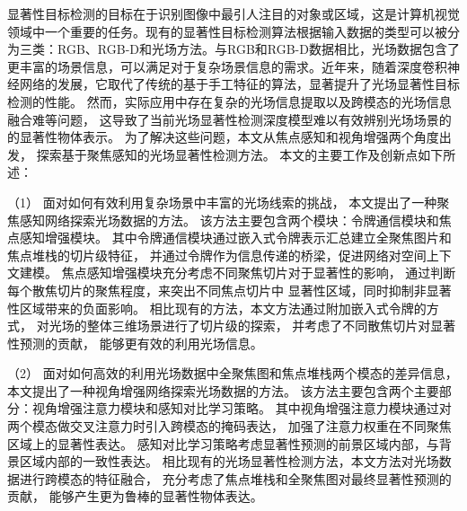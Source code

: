 显著性目标检测的目标在于识别图像中最引人注目的对象或区域，这是计算机视觉领域中一个重要的任务。现有的显著性目标检测算法根据输入数据的类型可以被分为三类：RGB、RGB-D和光场方法。与RGB和RGB-D数据相比，光场数据包含了更丰富的场景信息，可以满足对于复杂场景信息的需求。近年来，随着深度卷积神经网络的发展，它取代了传统的基于手工特征的算法，显著提升了光场显著性目标检测的性能。
%
%
%
%
然而，实际应用中存在复杂的光场信息提取以及跨模态的光场信息融合难等问题，
这导致了当前光场显著性检测深度模型难以有效辨别光场场景的的显著性物体表示。
%
%
为了解决这些问题，本文从焦点感知和视角增强两个角度出发，
探索基于聚焦感知的光场显著性检测方法。
本文的主要工作及创新点如下所述：









%
%
（1）
%
%
面对如何有效利用复杂场景中丰富的光场线索的挑战，
本文提出了一种聚焦感知网络探索光场数据的方法。
%
%
该方法主要包含两个模块：令牌通信模块和焦点感知增强模块。
%
%
其中令牌通信模块通过嵌入式令牌表示汇总建立全聚焦图片和焦点堆栈的切片级特征，
并通过令牌作为信息传递的桥梁，促进网络对空间上下文建模。
%
%
焦点感知增强模块充分考虑不同聚焦切片对于显著性的影响，
通过判断每个散焦切片的聚焦程度，来突出不同焦点切片中
显著性区域，同时抑制非显著性区域带来的负面影响。
%
%
相比现有的方法，本文方法通过附加嵌入式令牌的方式，
对光场的整体三维场景进行了切片级的探索，
并考虑了不同散焦切片对显著性预测的贡献，
能够更有效的利用光场信息。







%
%
（2）
%
%
面对如何高效的利用光场数据中全聚焦图和焦点堆栈两个模态的差异信息，
本文提出了一种视角增强网络探索光场数据的方法。
%
%
该方法主要包含两个主要部分：视角增强注意力模块和感知对比学习策略。
%
%
其中视角增强注意力模块通过对两个模态做交叉注意力时引入跨模态的掩码表达，
加强了注意力权重在不同聚焦区域上的显著性表达。
%
%
感知对比学习策略考虑显著性预测的前景区域内部，与背景区域内部的一致性表达。
%
%
相比现有的光场显著性检测方法，本文方法对光场数据进行跨模态的特征融合，
充分考虑了焦点堆栈和全聚焦图对最终显著性预测的贡献，
能够产生更为鲁棒的显著性物体表达。



